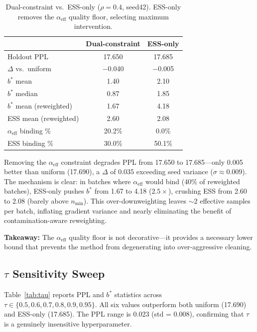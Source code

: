 \documentclass[11pt,a4paper]{article}
\newcommand{\bstar}{b^{*}}
\newcommand{\aeff}{\alpha_{\mathrm{eff}}}
\newcommand{\nmin}{n_{\min}}
\begin{document}
\begin{table}[t]
\centering
\small
\caption{Dual-constraint vs.\ ESS-only ($\rho{=}0.4$, seed42). ESS-only removes the $\aeff$ quality floor, selecting maximum intervention.}
\label{tab:ess_only}
\begin{tabular}{lcc}
\toprule
& \textbf{Dual-constraint} & \textbf{ESS-only} \\
\midrule
Holdout PPL & 17.650 & 17.685 \\
$\Delta$ vs.\ uniform & $-$0.040 & $-$0.005 \\
$\bstar$ mean & 1.40 & 2.10 \\
$\bstar$ median & 0.87 & 1.85 \\
$\bstar$ mean (reweighted) & 1.67 & 4.18 \\
ESS mean (reweighted) & 2.60 & 2.08 \\
$\aeff$ binding \% & 20.2\% & 0.0\% \\
ESS binding \% & 30.0\% & 50.1\% \\
\bottomrule
\end{tabular}
\end{table}

Removing the $\aeff$ constraint degrades PPL from 17.650 to 17.685---only 0.005 better than uniform (17.690), a $\Delta$ of 0.035 exceeding seed variance ($\sigma \approx 0.009$).
The mechanism is clear: in batches where $\aeff$ would bind (40\% of reweighted batches), ESS-only pushes $\bstar$ from 1.67 to 4.18 ($2.5\times$), crushing ESS from 2.60 to 2.08 (barely above $\nmin$).
This over-downweighting leaves ${\sim}2$ effective samples per batch, inflating gradient variance and nearly eliminating the benefit of contamination-aware reweighting.

\textbf{Takeaway:} The $\aeff$ quality floor is not decorative---it provides a necessary lower bound that prevents the method from degenerating into over-aggressive cleaning.


\subsection{$\tau$ Sensitivity Sweep}
\label{sec:tau_sweep}

Table~\ref{tab:tau} reports PPL and $\bstar$ statistics across $\tau \in \{0.5, 0.6, 0.7, 0.8, 0.9, 0.95\}$.
All six values outperform both uniform (17.690) and ESS-only (17.685).
The PPL range is 0.023 (std = 0.008), confirming that $\tau$ is a genuinely insensitive hyperparameter.
\end{document}
